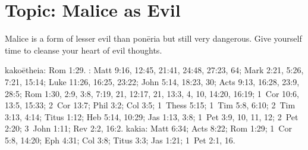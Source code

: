 \section{Topic: Malice as Evil}

Malice is a form of lesser evil than \gls{ponēria} but still very dangerous. Give yourself time to cleanse your heart of evil thoughts. 

\gls{kakoētheia}: Rom 1:29. : Matt 9:16, 12:45, 21:41, 24:48, 27:23, 64; Mark 2:21, 5:26, 7:21, 15:14; Luke 11:26, 16:25, 23:22; John 5:14, 18:23, 30; Acts 9:13, 16:28, 23:9, 28:5; Rom 1:30, 2:9, 3:8, 7:19, 21, 12:17, 21, 13:3, 4, 10, 14:20, 16:19; 1~Cor 10:6, 13:5, 15:33; 2~Cor 13:7; Phil 3:2; Col 3:5; 1~Thess 5:15; 1~Tim 5:8, 6:10; 2~Tim 3:13, 4:14; Titus 1:12; Heb 5:14, 10:29; Jas 1:13, 3:8; 1~Pet 3:9, 10, 11, 12; 2~Pet 2:20; 3~John 1:11; Rev 2:2, 16:2. \gls{kakia}: Matt 6:34; Acts 8:22; Rom 1:29; 1~Cor 5:8, 14:20; Eph 4:31; Col 3:8; Titus 3:3; Jas 1:21; 1~Pet 2:1, 16.
